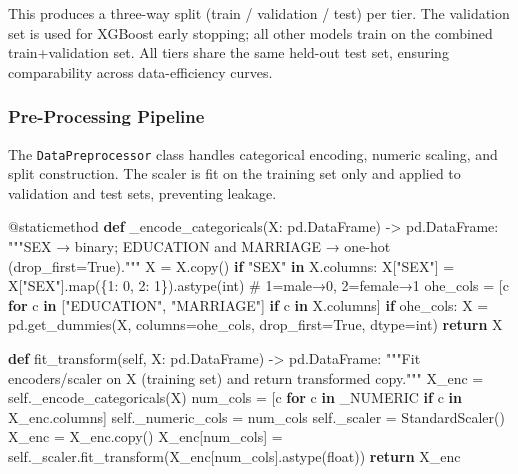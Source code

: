 \documentclass[
  letterpaper,
  DIV=11,
  numbers=noendperiod]{scrartcl}
\newenvironment{Shaded}{\begin{snugshade}}{\end{snugshade}}
\newcommand{\AttributeTok}[1]{\textcolor[rgb]{0.40,0.45,0.13}{#1}}
\newcommand{\BuiltInTok}[1]{\textcolor[rgb]{0.00,0.23,0.31}{#1}}
\newcommand{\CommentTok}[1]{\textcolor[rgb]{0.37,0.37,0.37}{#1}}
\newcommand{\ControlFlowTok}[1]{\textcolor[rgb]{0.00,0.23,0.31}{\textbf{#1}}}
\newcommand{\DecValTok}[1]{\textcolor[rgb]{0.68,0.00,0.00}{#1}}
\newcommand{\KeywordTok}[1]{\textcolor[rgb]{0.00,0.23,0.31}{\textbf{#1}}}
\newcommand{\NormalTok}[1]{\textcolor[rgb]{0.00,0.23,0.31}{#1}}
\newcommand{\OperatorTok}[1]{\textcolor[rgb]{0.37,0.37,0.37}{#1}}
\newcommand{\StringTok}[1]{\textcolor[rgb]{0.13,0.47,0.30}{#1}}
\newcommand{\VariableTok}[1]{\textcolor[rgb]{0.07,0.07,0.07}{#1}}
\begin{document}
This produces a three-way split (train / validation / test) per tier.
The validation set is used for XGBoost early stopping; all other models
train on the combined train+validation set. All tiers share the same
held-out test set, ensuring comparability across data-efficiency curves.

\subsubsection{Pre-Processing
Pipeline}\label{sec-credit-risk-preprocessing-snippet}

The \texttt{DataPreprocessor} class handles categorical encoding,
numeric scaling, and split construction. The scaler is fit on the
training set only and applied to validation and test sets, preventing
leakage.

\begin{Shaded}
\begin{Highlighting}[]
\AttributeTok{@staticmethod}
\KeywordTok{def}\NormalTok{ \_encode\_categoricals(X: pd.DataFrame) }\OperatorTok{{-}\textgreater{}}\NormalTok{ pd.DataFrame:}
    \CommentTok{"""SEX → binary; EDUCATION and MARRIAGE → one{-}hot (drop\_first=True)."""}
\NormalTok{    X }\OperatorTok{=}\NormalTok{ X.copy()}
    \ControlFlowTok{if} \StringTok{"SEX"} \KeywordTok{in}\NormalTok{ X.columns:}
\NormalTok{        X[}\StringTok{"SEX"}\NormalTok{] }\OperatorTok{=}\NormalTok{ X[}\StringTok{"SEX"}\NormalTok{].}\BuiltInTok{map}\NormalTok{(\{}\DecValTok{1}\NormalTok{: }\DecValTok{0}\NormalTok{, }\DecValTok{2}\NormalTok{: }\DecValTok{1}\NormalTok{\}).astype(}\BuiltInTok{int}\NormalTok{)  }\CommentTok{\# 1=male→0, 2=female→1}
\NormalTok{    ohe\_cols }\OperatorTok{=}\NormalTok{ [c }\ControlFlowTok{for}\NormalTok{ c }\KeywordTok{in}\NormalTok{ [}\StringTok{"EDUCATION"}\NormalTok{, }\StringTok{"MARRIAGE"}\NormalTok{] }\ControlFlowTok{if}\NormalTok{ c }\KeywordTok{in}\NormalTok{ X.columns]}
    \ControlFlowTok{if}\NormalTok{ ohe\_cols:}
\NormalTok{        X }\OperatorTok{=}\NormalTok{ pd.get\_dummies(X, columns}\OperatorTok{=}\NormalTok{ohe\_cols, drop\_first}\OperatorTok{=}\VariableTok{True}\NormalTok{, dtype}\OperatorTok{=}\BuiltInTok{int}\NormalTok{)}
    \ControlFlowTok{return}\NormalTok{ X}

\KeywordTok{def}\NormalTok{ fit\_transform(}\VariableTok{self}\NormalTok{, X: pd.DataFrame) }\OperatorTok{{-}\textgreater{}}\NormalTok{ pd.DataFrame:}
    \CommentTok{"""Fit encoders/scaler on X (training set) and return transformed copy."""}
\NormalTok{    X\_enc }\OperatorTok{=} \VariableTok{self}\NormalTok{.\_encode\_categoricals(X)}
\NormalTok{    num\_cols }\OperatorTok{=}\NormalTok{ [c }\ControlFlowTok{for}\NormalTok{ c }\KeywordTok{in}\NormalTok{ \_NUMERIC }\ControlFlowTok{if}\NormalTok{ c }\KeywordTok{in}\NormalTok{ X\_enc.columns]}
    \VariableTok{self}\NormalTok{.\_numeric\_cols }\OperatorTok{=}\NormalTok{ num\_cols}
    \VariableTok{self}\NormalTok{.\_scaler }\OperatorTok{=}\NormalTok{ StandardScaler()}
\NormalTok{    X\_enc }\OperatorTok{=}\NormalTok{ X\_enc.copy()}
\NormalTok{    X\_enc[num\_cols] }\OperatorTok{=} \VariableTok{self}\NormalTok{.\_scaler.fit\_transform(X\_enc[num\_cols].astype(}\BuiltInTok{float}\NormalTok{))}
    \ControlFlowTok{return}\NormalTok{ X\_enc}


\end{Highlighting}
\end{Shaded}
\end{document}
